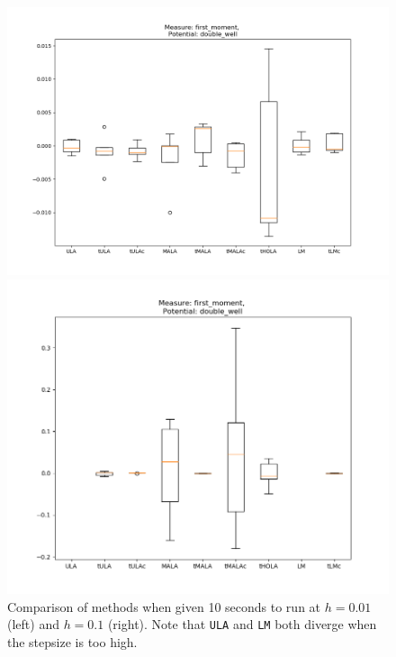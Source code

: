   \begin{figure}
\centering
  \begin{minipage}[b]{0.47\textwidth}
  \centering
    \includegraphics[width=\textwidth]{Figures/10sBoxPlot1moment100dim001step.png}
  \end{minipage} %
  \begin{minipage}[b]{0.47\textwidth}
  \centering
    \includegraphics[width=\textwidth]{Figures/10sBoxPlot1moment100dim01step.png}
  \end{minipage} %
  \caption{Comparison of methods when given 10 seconds to run at \(h=0.01\) (left) and \(h=0.1\) (right). Note that \texttt{ULA} and \texttt{LM} both diverge when the stepsize is too high.}
  \label{fig:timedRun}
  \end{figure}